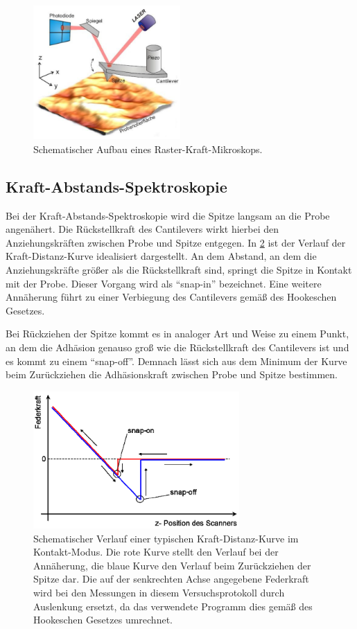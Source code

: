 \documentclass[
	a4paper,
	12pt,
	pagesize,
	ngerman
]{scrartcl}
\begin{document}
	\begin{figure}[H]
		\includegraphics[width=0.5\textwidth]{images/sonstiges/Aufbau}
		\centering
		\caption{Schematischer Aufbau eines Raster-Kraft-Mikroskops. \cite{Anleitung}}
		\label{fig_Aufbau}
		\centering
	\end{figure}

	\subsection{Kraft-Abstands-Spektroskopie}
	Bei der Kraft-Abstands-Spektroskopie wird die Spitze langsam an die Probe angenähert.
	Die Rückstellkraft des Cantilevers wirkt hierbei den Anziehungskräften zwischen Probe und Spitze entgegen.
	In \cref{fig_KDS} ist der Verlauf der Kraft-Distanz-Kurve idealisiert dargestellt.
	An dem Abstand, an dem die Anziehungskräfte größer als die Rückstellkraft sind, springt die Spitze in Kontakt mit der Probe.
	Dieser Vorgang wird als \enquote{snap-in} bezeichnet.
	Eine weitere Annäherung führt zu einer Verbiegung des Cantilevers gemäß des Hookeschen Gesetzes.

	Bei Rückziehen der Spitze kommt es in analoger Art und Weise zu einem Punkt, an dem die Adhäsion genauso groß wie die Rückstellkraft des Cantilevers ist und es kommt zu einem \enquote{snap-off}.
	Demnach lässt sich aus dem Minimum der Kurve beim Zurückziehen die Adhäsionskraft zwischen Probe und Spitze bestimmen.

	\begin{figure}[H]
		\includegraphics[width=0.7\textwidth]{images/sonstiges/KDS}
		\centering
		\caption{Schematischer Verlauf einer typischen Kraft-Distanz-Kurve im Kontakt-Modus. Die rote Kurve stellt den Verlauf bei der Annäherung, die blaue Kurve den Verlauf beim Zurückziehen der Spitze dar. Die auf der senkrechten Achse angegebene Federkraft wird bei den Messungen in diesem Versuchsprotokoll durch Auslenkung ersetzt, da das verwendete Programm dies gemäß des Hookeschen Gesetzes umrechnet. \cite{Anleitung}}
		\label{fig_KDS}
		\centering
	\end{figure}
\end{document}
